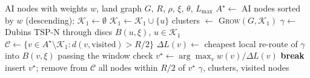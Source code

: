 \begin{algorithm}[t]
\caption{\textcolor{blue}{\textsc{LM-Tour} (v5: discs $B(\cdot,\xi)$)}}\label{alg:lmtour}
\begin{algorithmic}[1]\small\color{blue}
\Require AI nodes with weights $w$, land graph $G$, $R$, $\rho$, $\xi$, $\theta$, $L_{\max}$
\State $A^\star \gets$ AI nodes sorted by $w$ (descending); $\mathcal{K}_1 \gets \emptyset$
   $\mathcal{K}_1 \gets \mathcal{K}_1 \cup \{u\}$ \EndIf
\EndFor
\State clusters $\gets$ \textsc{Grow}$(G, \mathcal{K}_1)$ 
\State $\gamma \gets$ Dubins TSP-N through discs $B(u, \xi)$, $u \in \mathcal{K}_1$
\State $\mathcal{C} \gets \{v \in A^\star \setminus \mathcal{K}_1 : d(v, \text{visited}) > R/2\}$
\Repeat
   $\Delta L(v) \gets$ cheapest local re-route of $\gamma$ into $B(v, \xi)$ passing the window check \EndFor
  \State $v^\star \gets \arg\max_v w(v)/\Delta L(v)$
   \textbf{break} \EndIf
  \State insert $v^\star$; remove from $\mathcal{C}$ all nodes within $R/2$ of $v^\star$
\State \Return $\gamma$, clusters, visited nodes
\end{algorithmic}
\end{algorithm}
